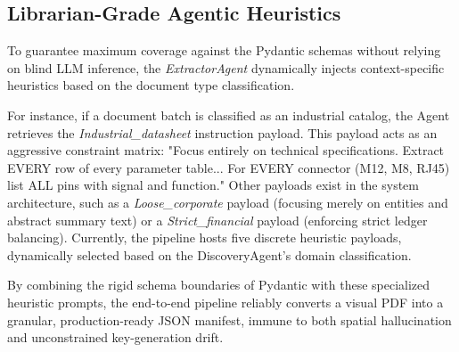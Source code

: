 \subsection{Librarian-Grade Agentic Heuristics}
To guarantee maximum coverage against the Pydantic schemas without relying on blind LLM inference, the \textit{ExtractorAgent} dynamically injects context-specific heuristics based on the document type classification.

For instance, if a document batch is classified as an industrial catalog, the Agent retrieves the \textit{Industrial\_datasheet} instruction payload. This payload acts as an aggressive constraint matrix: "Focus entirely on technical specifications. Extract EVERY row of every parameter table... For EVERY connector (M12, M8, RJ45) list ALL pins with signal and function." Other payloads exist in the system architecture, such as a \textit{Loose\_corporate} payload (focusing merely on entities and abstract summary text) or a \textit{Strict\_financial} payload (enforcing strict ledger balancing). Currently, the pipeline hosts five discrete heuristic payloads, dynamically selected based on the DiscoveryAgent's domain classification.

By combining the rigid schema boundaries of Pydantic with these specialized heuristic prompts, the end-to-end pipeline reliably converts a visual PDF into a granular, production-ready JSON manifest, immune to both spatial hallucination and unconstrained key-generation drift.
